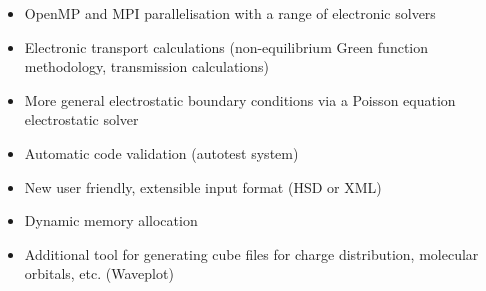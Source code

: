 \begin{itemize}
\item OpenMP and MPI parallelisation with a range of electronic solvers
\item Electronic transport calculations (non-equilibrium Green function
  methodology, transmission calculations)
\item More general electrostatic boundary conditions via a Poisson equation
  electrostatic solver
\item Automatic code validation (autotest system)
\item New user friendly, extensible input format (HSD or XML)
\item Dynamic memory allocation
\item Additional tool for generating cube files for charge distribution,
  molecular orbitals, etc. (Waveplot)
\end{itemize}
